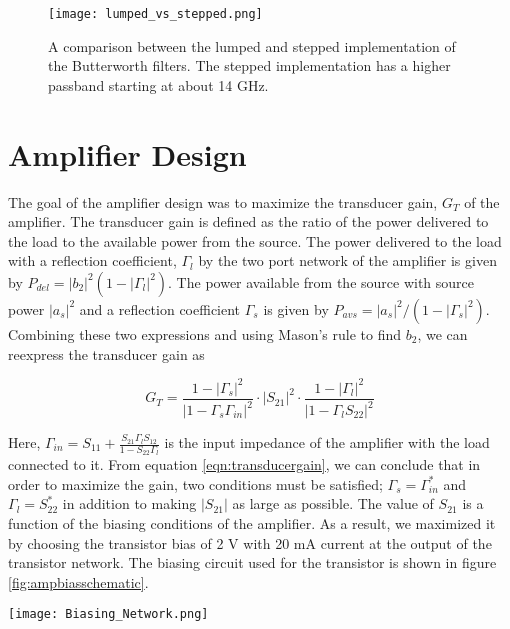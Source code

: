 \documentclass{article}
\begin{document}
\begin{figure}[!htbp]
    \centering
    \texttt{[image: lumped\_vs\_stepped.png]}
    \caption{A comparison between the lumped and stepped implementation of the Butterworth filters. The stepped implementation has a higher passband starting at about 14 GHz.}
    \label{fig:lumpedvsstepped}
\end{figure}

\section*{Amplifier Design}\label{sec:ampdesign}
The goal of the amplifier design was to maximize the transducer gain, $G_T$ of the amplifier. The transducer gain is defined as the ratio of the power delivered to the load to the available power from the source. The power delivered to the load with a reflection coefficient, $\Gamma_l$ by the two port network of the amplifier is given by $P_{del} = |b_2|^2 \left(1 - |\Gamma_l|^2\right) $. The power available from the source with source power $|a_s|^2$ and a reflection coefficient $\Gamma_s$ is given by $P_{avs} = |a_s|^2 /\left(1 - |\Gamma_s|^2 \right)$. Combining these two expressions and using Mason's rule to find $b_2$, we can reexpress the transducer gain as 

\begin{equation}
    G_T = \frac{1 - |\Gamma_s|^2}{|1 - \Gamma_s \Gamma_{in}|^2} \cdot |S_{21}|^2 \cdot \frac{1  - |\Gamma_l|^2}{|1 - \Gamma_l S_{22}|^2}
    \label{eqn:transducergain}
\end{equation}

Here, $\Gamma_{in} = S_{11} + \frac{S_{21} \Gamma_l S_{12}}{1 - S_{22} \Gamma_l}$ is the input impedance of the amplifier with the load connected to it. From equation \ref{eqn:transducergain}, we can conclude that in order to maximize the gain, two conditions must be satisfied; $\Gamma_s = \Gamma_{in}^*$ and $\Gamma_l = S_{22}^*$ in addition to making $|S_{21}|$ as large as possible. The value of $S_{21}$ is a function of the biasing conditions of the amplifier. As a result, we maximized it by choosing the transistor bias of 2 V with 20 mA current at the output of the transistor network. The biasing circuit used for the transistor is shown in figure \ref{fig:ampbiasschematic}. 

\begin{figure*}[!htbp]
    \centering
    \texttt{[image: Biasing\_Network.png]}
    \caption{The biasing network chosen to achieve 2 V at the output with 20 mA collector current. The inductors in the biasing network are used for amplifier stability.}
    \label{fig:ampbiasschematic}
\end{figure*}
\end{document}
